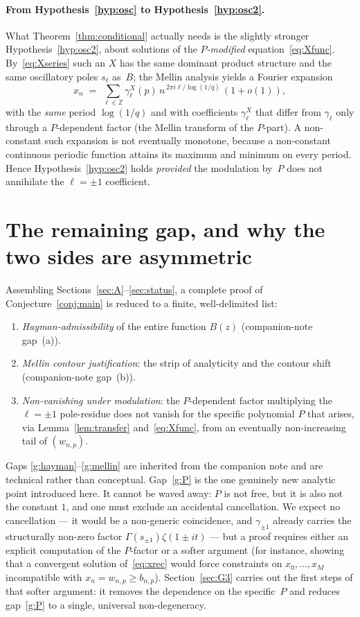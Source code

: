 \documentclass[11pt]{article}
\theoremstyle{definition}
\newcommand{\Z}{\mathbb{Z}}
\begin{document}
\paragraph{From Hypothesis~\ref{hyp:osc} to
Hypothesis~\ref{hyp:osc2}.} What
Theorem~\ref{thm:conditional} actually needs is the slightly stronger
Hypothesis~\ref{hyp:osc2}, about solutions of the \emph{$P$-modified}
equation~\eqref{eq:Xfunc}. By~\eqref{eq:Xseries} such an $X$ has the
same dominant product structure and the same oscillatory poles
$s_\ell$ as~$B$; the Mellin analysis yields a Fourier expansion
\[
  x_n \;=\; \sum_{\ell\in\Z}\gamma_\ell^X(p)\,
  n^{\,2\pi i\ell/\log(1/q)}\,(1+o(1)),
\]
with the \emph{same} period $\log(1/q)$ and with coefficients
$\gamma_\ell^X$ that differ from $\gamma_\ell$ only through a
$P$-dependent factor (the Mellin transform of the $P$-part). A
non-constant such expansion is not eventually monotone, because a
non-constant continuous periodic function attains its maximum and
minimum on every period. Hence Hypothesis~\ref{hyp:osc2} holds
\emph{provided} the modulation by~$P$ does not annihilate the
$\ell=\pm 1$ coefficient.

\section{The remaining gap, and why the two sides are
  asymmetric}\label{sec:gap}

Assembling Sections~\ref{sec:A}--\ref{sec:status}, a complete proof of
Conjecture~\ref{conj:main} is reduced to a finite, well-delimited list:
\begin{enumerate}[label=(G\arabic*),leftmargin=3em]
\item\label{g:hayman} \emph{Hayman-admissibility} of the entire
  function $B(z)$ (companion-note gap~(a)).
\item\label{g:mellin} \emph{Mellin contour justification}: the strip
  of analyticity and the contour shift (companion-note gap~(b)).
\item\label{g:P} \emph{Non-vanishing under modulation}: the
  $P$-dependent factor multiplying the $\ell=\pm 1$ pole-residue does
  not vanish for the specific polynomial $P$ that arises, via
  Lemma~\ref{lem:transfer} and~\eqref{eq:Xfunc}, from an eventually
  non-increasing tail of $(w_{n,p})$.
\end{enumerate}
Gaps \ref{g:hayman}--\ref{g:mellin} are inherited from the companion
note and are technical rather than conceptual. Gap~\ref{g:P} is the
one genuinely new analytic point introduced here. It cannot be waved
away: $P$ is not free, but it is also not the constant $1$, and one
must exclude an accidental cancellation. We expect no cancellation ---
it would be a non-generic coincidence, and $\gamma_{\pm1}$ already
carries the structurally non-zero factor $\Gamma(s_{\pm1})\zeta(1\pm
it)$ --- but a proof requires either an explicit computation of the
$P$-factor or a softer argument (for instance, showing that a
convergent solution of~\eqref{eq:xrec} would force constraints on
$x_0,\dots,x_M$ incompatible with $x_n=w_{n,p}\ge b_{n,p}$).
Section~\ref{sec:G3} carries out the first steps of that softer
argument: it removes the dependence on the specific~$P$ and reduces
gap~\ref{g:P} to a single, universal non-degeneracy.
\end{document}

